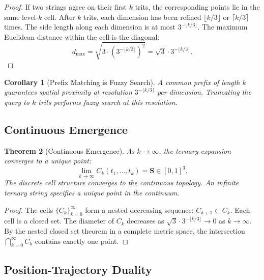 \documentclass[11pt,twocolumn,a4paper]{article}
\newtheorem{theorem}{Theorem}[section]
\newtheorem{corollary}[theorem]{Corollary}
\theoremstyle{definition}
\theoremstyle{remark}
\begin{document}
\begin{proof}
If two strings agree on their first $k$ trits, the corresponding points lie in the same level-$k$ cell. After $k$ trits, each dimension has been refined $\lfloor k/3 \rfloor$ or $\lceil k/3 \rceil$ times. The side length along each dimension is at most $3^{-\lfloor k/3 \rfloor}$. The maximum Euclidean distance within the cell is the diagonal:
\begin{equation}
d_{\max} = \sqrt{3 \cdot (3^{-\lfloor k/3 \rfloor})^2} = \sqrt{3} \cdot 3^{-\lfloor k/3 \rfloor}.
\end{equation}
\end{proof}

\begin{corollary}[Prefix Matching is Fuzzy Search]
\label{cor:prefix_fuzzy}
A common prefix of length $k$ guarantees spatial proximity at resolution $3^{-\lfloor k/3 \rfloor}$ per dimension. Truncating the query to $k$ trits performs fuzzy search at this resolution.
\end{corollary}

\subsection{Continuous Emergence}

\begin{theorem}[Continuous Emergence]
\label{thm:continuous}
As $k \to \infty$, the ternary expansion converges to a unique point:
\begin{equation}
\lim_{k \to \infty} C_k(t_1, \ldots, t_k) = \mathbf{S} \in [0,1]^3.
\label{eq:convergence}
\end{equation}
The discrete cell structure converges to the continuous topology. An infinite ternary string specifies a unique point in the continuum.
\end{theorem}

\begin{proof}
The cells $\{C_k\}_{k=0}^\infty$ form a nested decreasing sequence: $C_{k+1} \subset C_k$. Each cell is a closed set. The diameter of $C_k$ decreases as $\sqrt{3} \cdot 3^{-\lfloor k/3 \rfloor} \to 0$ as $k \to \infty$. By the nested closed set theorem in a complete metric space, the intersection $\bigcap_{k=0}^\infty C_k$ contains exactly one point.
\end{proof}

\subsection{Position-Trajectory Duality}
\end{document}
